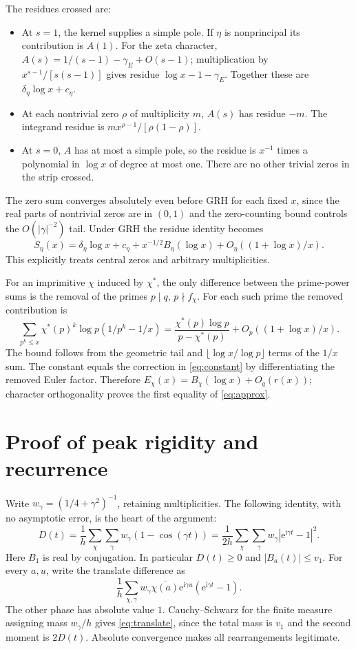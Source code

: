 \documentclass[11pt]{article}
\theoremstyle{remark}\newtheorem{remark}[theorem]{Remark}
\newcommand{\e}{\mathrm{e}}
\newcommand{\ii}{\mathrm{i}}
\begin{document}
The residues crossed are:
\begin{itemize}
\item At $s=1$, the kernel supplies a simple pole. If $\eta$ is nonprincipal its contribution is $A(1)$. For the zeta character, $A(s)=1/(s-1)-\gamma_E+O(s-1)$; multiplication by $x^{s-1}/[s(s-1)]$ gives residue $\log x-1-\gamma_E$. Together these are $\delta_\eta\log x+c_\eta$.
\item At each nontrivial zero $\rho$ of multiplicity $m$, $A(s)$ has residue $-m$. The integrand residue is $m x^{\rho-1}/[\rho(1-\rho)]$.
\item At $s=0$, $A$ has at most a simple pole, so the residue is $x^{-1}$ times a polynomial in $\log x$ of degree at most one. There are no other trivial zeros in the strip crossed.
\end{itemize}
The zero sum converges absolutely even before GRH for each fixed $x$, since the real parts of nontrivial zeros are in $(0,1)$ and the zero-counting bound controls the $O(|\gamma|^{-2})$ tail. Under GRH the residue identity becomes
\[
 S_\eta(x)=\delta_\eta\log x+c_\eta
   +x^{-1/2} B_\eta(\log x)+O_\eta((1+\log x)/x).
\]
This explicitly treats central zeros and arbitrary multiplicities.

For an imprimitive $\chi$ induced by $\chi^*$, the only difference between the prime-power sums is the removal of the primes $p\mid q$, $p\nmid f_\chi$. For each such prime the removed contribution is
\[
 \sum_{p^k\le x}\chi^*(p)^k\log p(1/p^k-1/x)
 =\frac{\chi^*(p)\log p}{p-\chi^*(p)}+O_p((1+\log x)/x).
\]
The bound follows from the geometric tail and $\lfloor\log x/\log p\rfloor$ terms of the $1/x$ sum. The constant equals the correction in \eqref{eq:constant} by differentiating the removed Euler factor. Therefore $E_\chi(x)=B_\chi(\log x)+O_q(r(x))$; character orthogonality proves the first equality of \eqref{eq:approx}.

\section{Proof of peak rigidity and recurrence}
Write $w_\gamma=(1/4+\gamma^2)^{-1}$, retaining multiplicities. The following identity, with no asymptotic error, is the heart of the argument:
\begin{equation}\label{eq:energy}
 D(t)=\frac1h\sum_\chi\sum_\gamma w_\gamma(1-\cos(\gamma t))
 =\frac1{2h}\sum_\chi\sum_\gamma w_\gamma|\e^{\ii\gamma t}-1|^2.
\end{equation}
Here $B_1$ is real by conjugation. In particular $D(t)\ge0$ and $|B_a(t)|\le v_1$. For every $a,u$, write the translate difference as
\[
 \frac1h\sum_{\chi,\gamma}w_\gamma\overline{\chi(a)}\e^{\ii\gamma u}(\e^{\ii\gamma t}-1).
\]
The other phase has absolute value $1$. Cauchy--Schwarz for the finite measure assigning mass $w_\gamma/h$ gives \eqref{eq:translate}, since the total mass is $v_1$ and the second moment is $2D(t)$. Absolute convergence makes all rearrangements legitimate.
\end{document}
